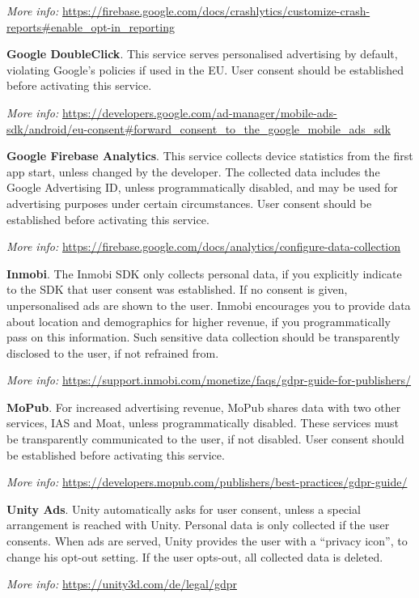 \documentclass[
]{book}
\begin{document}
\emph{More info:} \url{https://firebase.google.com/docs/crashlytics/customize-crash-reports\#enable_opt-in_reporting}

\textbf{Google DoubleClick}. This service serves personalised advertising by default, violating Google's policies if used in the EU. User consent should be established before activating this service.

\emph{More info:} \url{https://developers.google.com/ad-manager/mobile-ads-sdk/android/eu-consent\#forward_consent_to_the_google_mobile_ads_sdk}

\textbf{Google Firebase Analytics}. This service collects device statistics from the first app start, unless changed by the developer. The collected data includes the Google Advertising ID, unless programmatically disabled, and may be used for advertising purposes under certain circumstances. User consent should be established before activating this service.

\emph{More info:} \url{https://firebase.google.com/docs/analytics/configure-data-collection}

\textbf{Inmobi}. The Inmobi SDK only collects personal data, if you explicitly indicate to the SDK that user consent was established. If no consent is given, unpersonalised ads are shown to the user. Inmobi encourages you to provide data about location and demographics for higher revenue, if you programmatically pass on this information. Such sensitive data collection should be transparently disclosed to the user, if not refrained from.

\emph{More info:} \url{https://support.inmobi.com/monetize/faqs/gdpr-guide-for-publishers/}

\textbf{MoPub}. For increased advertising revenue, MoPub shares data with two other services, IAS and Moat, unless programmatically disabled. These services must be transparently communicated to the user, if not disabled. User consent should be established before activating this service.

\emph{More info:} \url{https://developers.mopub.com/publishers/best-practices/gdpr-guide/}

\textbf{Unity Ads}. Unity automatically asks for user consent, unless a special arrangement is reached with Unity. Personal data is only collected if the user consents. When ads are served, Unity provides the user with a ``privacy icon'', to change his opt-out setting. If the user opts-out, all collected data is deleted.

\emph{More info:} \url{https://unity3d.com/de/legal/gdpr}
\end{document}

